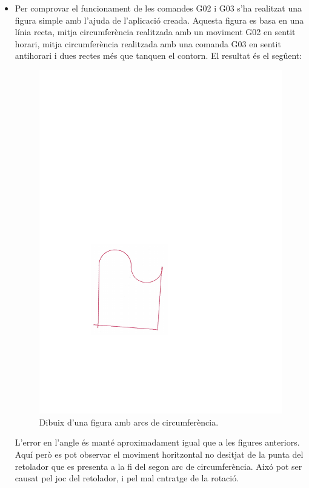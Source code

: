 \begin{itemize}
	\item Per comprovar el funcionament de les comandes G02 i G03 s'ha realitzat una figura simple amb l'ajuda de l'aplicació creada. Aquesta figura es basa en una línia recta, mitja circumferència realitzada amb un moviment G02 en sentit horari, mitja circumferència realitzada amb una comanda G03 en sentit antihorari i dues rectes més que tanquen el contorn. El resultat és el segûent:
	\begin{figure}[H]
		\centering
		\includegraphics{resultatFuncionara}
		\caption{Dibuix d'una figura amb arcs de circumferència.}
		\label{fig:funcionara}
	\end{figure}	
	L'error en l'angle és manté aproximadament igual que a les figures anteriors. Aquí però es pot observar el moviment horitzontal no desitjat de la punta del retolador que es presenta a la fi del segon arc de circumferència. Aixó pot ser causat pel joc del retolador, i pel mal cntratge de la rotació.
	

\end{itemize}
